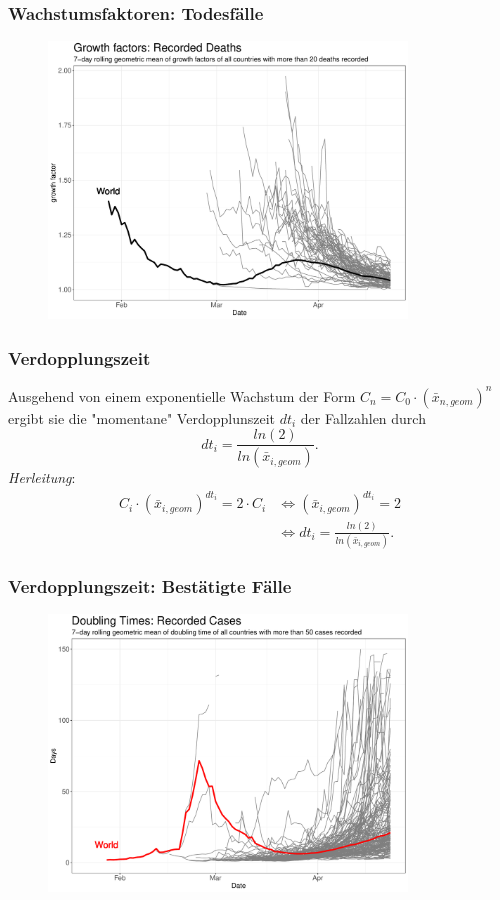\documentclass{beamer}
\begin{document}
\begin{frame}
	\frametitle{Wachstumsfaktoren: Todesfälle}
	\begin{figure}
		\centering
		\includegraphics[width = 270pt]{GF_deaths}
	\end{figure}
\end{frame}

\begin{frame}
	\frametitle{Verdopplungszeit}
	Ausgehend von einem exponentielle Wachstum der Form $C_n = C_0 \cdot (\bar{x}_{n, geom})^{n}$ ergibt sie die "momentane" Verdopplunszeit $dt_i$ der Fallzahlen durch $$dt_i = \frac{ln(2)}{ln(\bar{x}_{i, geom})}.$$
	\pause
	\emph{Herleitung}: 
	\begin{align*} C_i \cdot (\bar{x}_{i, geom})^{dt_i} = 2 \cdot C_i 
		 &\iff (\bar{x}_{i, geom})^{dt_i} = 2 \\
	 	&\iff dt_i = \frac{ln(2)}{ln(\bar{x}_{i, geom})}.
	\end{align*}
\end{frame}

\begin{frame}
	\frametitle{Verdopplungszeit: Bestätigte Fälle}
	\begin{figure}
		\centering
		\includegraphics[width = 270pt]{DT_confirmed}
	\end{figure}
\end{frame}
\end{document}
